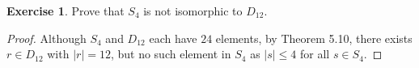\documentclass{article}
\theoremstyle{definition}
\newtheorem{theorem}{Exercise}[section]
\begin{document}
	\setcounter{theorem}{11}
	\begin{theorem}
		Prove that $S_4$ is not isomorphic to $D_{12}$. 
	\end{theorem}
	\begin{proof}
		Although $S_4$ and $D_{12}$ each have $24$ elements, by Theorem 5.10, there exists $r\in D_{12}$ with $|r|=12$, but no such element in $S_4$ as $|s|\leq 4$ for all $s\in S_4$. 
	\end{proof}
\end{document}
